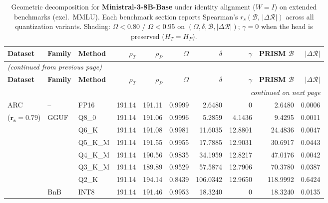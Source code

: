 \begingroup
\small
\setlength{\tabcolsep}{4pt}
\renewcommand{\arraystretch}{1.05}
\setlength{\LTcapwidth}{\textwidth}
\begin{longtable}{ll l rrrrrrr}
\caption{Geometric decomposition for \textbf{Ministral-3-8B-Base} under identity alignment ($W{=}I$) on extended benchmarks (excl.\ MMLU). Each benchmark section reports Spearman's $r_s(\mathcal{B},\,|\Delta\mathcal{R}|)$ across all quantization variants. Shading: \colorbox{red!35}{$\Omega{<}0.80$} / \colorbox{red!18}{$\Omega{<}0.95$} on $(\Omega,\delta,\mathcal{B},|\Delta\mathcal{R}|)$; \colorbox{cyan!12}{$\gamma{=}0$} when the head is preserved ($H_T{=}H_P$).}\label{tab:mistral_decomposition_ext_bound}\\
\toprule
\textbf{Dataset} & \textbf{Family} & \textbf{Method} & \textbf{$\rho_T$} & \textbf{$\rho_P$} & \textbf{$\Omega$} & \textbf{$\delta$} & \textbf{$\gamma$} & \textbf{PRISM $\mathcal{B}$} & \textbf{$|\Delta\mathcal{R}|$} \\
\midrule
\endfirsthead
\multicolumn{10}{l}{\small\itshape (continued from previous page)}\\
\toprule
\textbf{Dataset} & \textbf{Family} & \textbf{Method} & \textbf{$\rho_T$} & \textbf{$\rho_P$} & \textbf{$\Omega$} & \textbf{$\delta$} & \textbf{$\gamma$} & \textbf{PRISM $\mathcal{B}$} & \textbf{$|\Delta\mathcal{R}|$} \\
\midrule
\endhead
\midrule
\multicolumn{10}{r}{\small\itshape continued on next page}\\
\endfoot
\bottomrule
\endlastfoot
ARC & -- & FP16 & 191.14 & 191.11 & 0.9999 & 2.6480 & \cellcolor{cyan!12} $0$ & 2.6480 & 0.0006 \\
{\small ($\mathbf{r_s{=}0.79}$)} & GGUF & Q8\_0 & 191.14 & 191.06 & 0.9996 & 5.2859 & 4.1436 & 9.4295 & 0.0011 \\
 &  & Q6\_K & 191.14 & 191.08 & 0.9981 & 11.6035 & 12.8801 & 24.4836 & 0.0047 \\
 &  & Q5\_K\_M & 191.14 & 191.55 & 0.9955 & 17.7885 & 12.9031 & 30.6917 & 0.0443 \\
 &  & Q4\_K\_M & 191.14 & 190.56 & 0.9835 & 34.1959 & 12.8217 & 47.0176 & 0.0042 \\
 &  & Q3\_K\_M & 191.14 & 189.89 & 0.9529 & 57.5874 & 12.7906 & 70.3780 & 0.0387 \\
 &  & Q2\_K & 191.14 & 194.14 & \cellcolor{red!18} 0.8439 & \cellcolor{red!18} 106.0342 & 12.9650 & \cellcolor{red!18} 118.9992 & \cellcolor{red!18} 0.6424 \\
 & BnB & INT8 & 191.14 & 191.46 & 0.9953 & 18.3240 & \cellcolor{cyan!12} $0$ & 18.3240 & 0.0135 \\

\end{longtable}
